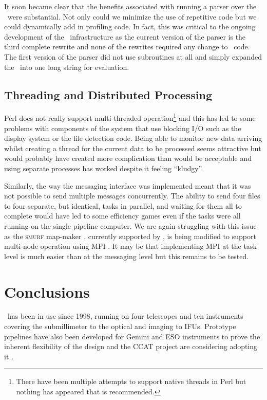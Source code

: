 \documentclass[final,authoryear,5p,times,twocolumn]{elsarticle}
\begin{document}
It soon became clear that the benefits associated
with running a parser over the \primitives\ were substantial. Not only
could we minimize the use of repetitive code but we could dynamically
add in profiling code. In fact, this was critical to the ongoing
development of the \oracdr\ infrastructure as the current version of
the parser is the third complete rewrite and none of the rewrites
required any change to \primitive\ code. The first version of the
parser did not use subroutines at all and simply expanded the \recipe\
into one long string for evaluation.

\subsection{Threading and Distributed Processing}

Perl does not really support multi-threaded
operation\footnote{There have been multiple attempts to support native
  threads in Perl but nothing has appeared that is recommended.}
and this has led to some problems with components of the system that
use blocking I/O such as the display system or the file detection
code. Being able to monitor new data arriving whilst creating a thread for the
current data to be processed seems attractive but would probably have
created more complication than would be acceptable and using separate
processes has worked despite it feeling ``kludgy''.

Similarly, the way the messaging interface was implemented meant that
it was not possible to send multiple messages concurrently. The
ability to send four files to four separate, but identical, tasks in
parallel, and waiting for them all to complete would have led to some
efficiency games even if the tasks were all running on the single
pipeline computer. We are again struggling with this issue as
the \textsc{smurf} map-maker \citep[][]{2013MNRAS.430.2545C}, currently supported by
\oracdr, is being modified to support
multi-node operation using MPI \citep{2014ASPC..485..399M}. It may be
that implementing MPI at the task level is much easier than at the
messaging level but this remains to be tested.

\section{Conclusions}

\oracdr\ has been in use since 1998, running on four telescopes and ten
instruments covering the submillimeter to the optical and imaging to
IFUs. Prototype pipelines have also been developed for Gemini and ESO
instruments to prove the inherent flexibility of the design
\citep{2003ASPC..295..237C,2004ASPC..314..460C} and the CCAT project
are considering adopting it \citep{2014SPIE9152-109}.
\end{document}
